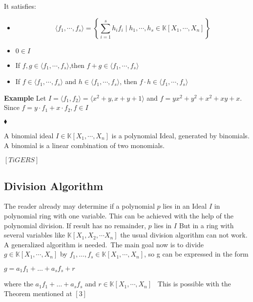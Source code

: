 It satisfies: \\
\begin{center}

\begin{itemize}
\item
\[ \langle f_{1}, \cdots , f_{s} \rangle = \left\lbrace  \sum_{i=1}^s h_{i}f_{i} \mid h_{1}, \cdots , h_{s} \in \mathbb{K}\left[X_{1}, \cdots, X_{n}\right] \right\rbrace \]
\item
$0 \in I$ 
\item
If $f,g \in \langle f_{1}, \cdots , f_{s} \rangle$,then  $f+g \in \langle f_{1}, \cdots , f_{s} \rangle$ 
\item
If $f \in \langle f_{1}, \cdots , f_{s} \rangle$ and $h \in  \langle f_{1}, \cdots , f_{s} \rangle$, then $f \cdot h \in \langle f_{1}, \cdots , f_{s} \rangle$
\end{itemize}

\end{center}




\textbf{Example} Let $ I= \langle f_{1},f_{2} \rangle = \langle x^{2}+y, x+y+1 \rangle $ and $f=yx^{2}+y^{2}+x^{2}+xy+x$. Since $f= y \cdot f_{1} + x \cdot f_{2}, f\in I$ \begin{flushright}
$\blacklozenge$
\end{flushright} 



\begin{env_definition}
A binomial ideal $ I \in \mathbb{K}\left[X_{1}, \cdots, X_{n}\right]$ is a polynomial Ideal, generated by binomials. A binomial is a linear combination of two monomials.

\end{env_definition}

\begin{env_definition}
$[TiGERS]$

\end{env_definition}

\subsection{Division Algorithm}

The reader already may determine if a polynomial $p$ lies in an Ideal $I$ in polynomial ring with one variable. This can be achieved with the help of the polynomial division.
If result has no remainder, $p$ lies in $I$
But in a ring with several variables like $ \mathbb{K} \left[X_{1},X_{2},\cdots X_{n}\right] $ the usual division algorithm can not work. A generalized algorithm is needed.\
The main goal now is to divide $g \in \mathbb{K}\left[X_{1}, \cdots, X_{n}\right] $ by 
$f_{1}, \ldots, f_{s} \in \mathbb{K}\left[X_{1}, \cdots, X_{n}\right]$, so g can be expressed in the form \begin{center}
$g = a_{1}f_{1}+ \ldots + a_{s}f_{s} +r$
\end{center} 
where the $a_{1}f_{1}+ \ldots + a_{s}f_{s} $ and $r \in \mathbb{K}\left[X_{1}, \cdots, X_{n}\right]$ \
This is possible with the Theorem mentioned at  $\left[ 3\right] $


